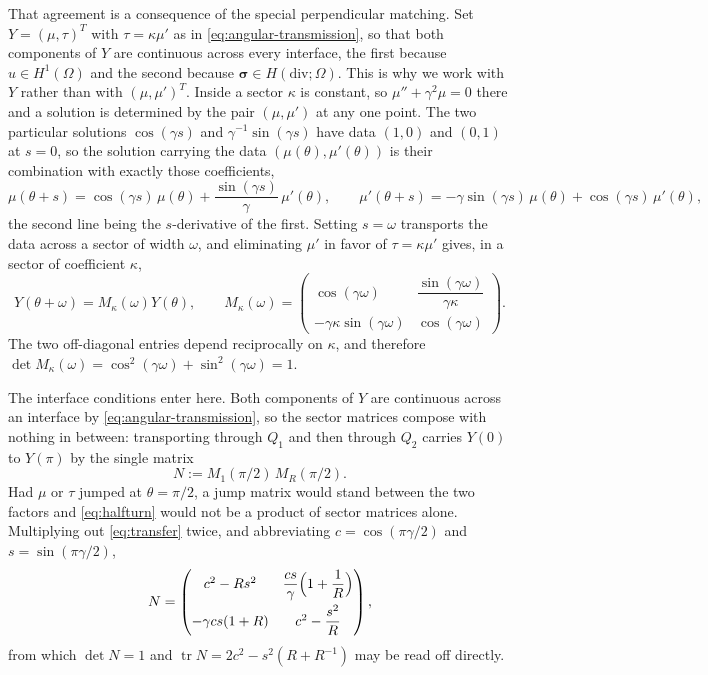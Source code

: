 \documentclass[10pt,pdftex]{amsart}%
\numberwithin{equation}{section}
\newcommand{\bsig}{\boldsymbol{\sigma}}
\begin{document}
That agreement is a consequence of the special perpendicular matching.  Set $Y=(\mu,\tau)^T$ with $\tau=\kappa\mu'$ as in \eqref{eq:angular-transmission}, so that both components of $Y$ are continuous across every interface, the first because $u\in H^1(\Omega)$ and the second because $\bsig\in H(\mathrm{div};\Omega)$.  This is why we work with $Y$ rather than with $(\mu,\mu')^T$.  Inside a sector $\kappa$ is constant, so $\mu''+\gamma^2\mu=0$ there and a solution is determined by the pair $(\mu,\mu')$ at any one point.  The two particular solutions $\cos(\gamma s)$ and $\gamma^{-1}\sin(\gamma s)$ have data $(1,0)$ and $(0,1)$ at $s=0$, so the solution carrying the data $(\mu(\theta),\mu'(\theta))$ is their combination with exactly those coefficients,
\[
\mu(\theta+s)=\cos(\gamma s)\,\mu(\theta)+\frac{\sin(\gamma s)}{\gamma}\,\mu'(\theta),
\qquad
\mu'(\theta+s)=-\gamma\sin(\gamma s)\,\mu(\theta)+\cos(\gamma s)\,\mu'(\theta),
\]
the second line being the $s$-derivative of the first.  Setting $s=\omega$ transports the data across a sector of width $\omega$, and eliminating $\mu'$ in favor of $\tau=\kappa\mu'$ gives, in a sector of coefficient $\kappa$,
\begin{equation}\label{eq:transfer}
 Y(\theta+\omega)=M_\kappa(\omega)Y(\theta),\qquad
 M_\kappa(\omega)=
 \begin{pmatrix}
 \cos(\gamma\omega)&\dfrac{\sin(\gamma\omega)}{\gamma\kappa}\\[2mm]
 -\gamma\kappa\sin(\gamma\omega)&\cos(\gamma\omega)
 \end{pmatrix}.
\end{equation}
The two off-diagonal entries depend reciprocally on $\kappa$, and therefore $\det M_\kappa(\omega)=\cos^2(\gamma\omega)+\sin^2(\gamma\omega)=1$.

The interface conditions enter here.  Both components of $Y$ are continuous across an interface by \eqref{eq:angular-transmission}, so the sector matrices compose with nothing in between: transporting through $Q_1$ and then through $Q_2$ carries $Y(0)$ to $Y(\pi)$ by the single matrix
\begin{equation}\label{eq:halfturn}
  N:=M_1(\pi/2)\,M_R(\pi/2).
\end{equation}
Had $\mu$ or $\tau$ jumped at $\theta=\pi/2$, a jump matrix would stand between the two factors and \eqref{eq:halfturn} would not be a product of sector matrices alone.  Multiplying out \eqref{eq:transfer} twice, and abbreviating $c=\cos(\pi\gamma/2)$ and $s=\sin(\pi\gamma/2)$,
\begin{equation}\label{eq:Nexplicit}
  N=\begin{pmatrix}
  c^2-Rs^2 & \dfrac{cs}{\gamma}\Bigl(1+\dfrac1R\Bigr)\\[3mm]
  -\gamma cs(1+R) & c^2-\dfrac{s^2}{R}
  \end{pmatrix},
\end{equation}
from which $\det N=1$ and $\operatorname{tr}N=2c^2-s^2(R+R^{-1})$ may be read off directly.
\end{document}
